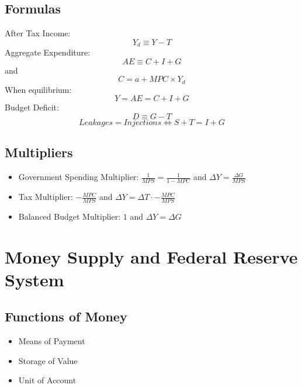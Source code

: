 \documentclass[11pt]{article}
\begin{document}
\subsection{Formulas}
After Tax Income:
\begin{equation}
    Y_d \equiv Y - T
\end{equation}
Aggregate Expenditure:
\begin{equation}
    AE \equiv C + I + G
\end{equation}
and
\begin{equation}
    C = a + MPC \times Y_d
\end{equation}
When equilibrium:
\begin{equation}
    Y = AE = C + I + G 
\end{equation}
Budget Deficit:
\begin{equation}
    D \equiv G - T
\end{equation}
\begin{equation}
    Leakages = Injections \Leftrightarrow S + T  = I + G
\end{equation}

\subsection{Multipliers}
    \begin{itemize}
        \item Government Spending Multiplier: $\frac{1}{MPS} = \frac{1}{1-MPC}$ and $\Delta Y = \frac{\Delta G}{MPS}$
        \item Tax Multiplier: $-\frac{MPC}{MPS}$ and $\Delta Y = \Delta T \cdot - \frac{MPC}{MPS}$
        \item Balanced Budget Multiplier: $1$ and $\Delta Y = \Delta G$
    \end{itemize}

\section{Money Supply and Federal Reserve System}
\subsection{Functions of Money}
    \begin{itemize}
        \item Means of Payment
        \item Storage of Value
        \item Unit of Account
    \end{itemize}
\end{document}
